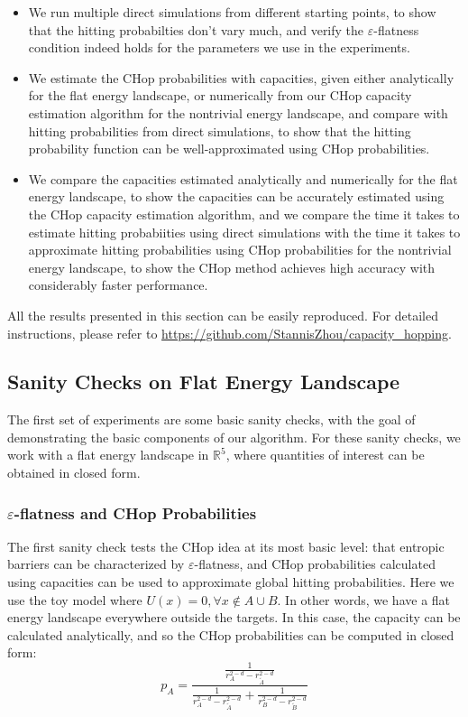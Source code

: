 \documentclass[english, aip, jcp, priprint, graphicx]{revtex4-1}
\theoremstyle{plain}
\theoremstyle{definition}
\theoremstyle{plain}
\begin{document}
\begin{itemize}
\item We run multiple direct simulations from different starting points, to show that the hitting probabilties don't vary much, and verify the $\varepsilon$-flatness condition indeed holds for the parameters we use in the experiments.
\item We estimate the CHop probabilities with capacities, given either analytically for the flat energy landscape, or numerically from our CHop capacity estimation algorithm for the nontrivial energy landscape, and compare with hitting probabilities from direct simulations, to show that the hitting probability function can be well-approximated using CHop probabilities.
\item We compare the capacities estimated analytically and numerically for the flat energy landscape, to show the capacities can be accurately estimated using the CHop capacity estimation algorithm, and we compare the time it takes to estimate hitting probabiities using direct simulations with the time it takes to approximate hitting probabilities using CHop probabilities for the nontrivial energy landscape, to show the CHop method achieves high accuracy with considerably faster performance.
\end{itemize}

All the results presented in this section can be easily reproduced. For detailed instructions, please refer to \url{https://github.com/StannisZhou/capacity_hopping}.

\subsection{Sanity Checks on Flat Energy Landscape}

The first set of experiments are some basic sanity checks, with the goal of demonstrating the basic components of our algorithm. For these sanity checks, we work with a flat energy landscape in $\mathbb{R}^5$, where quantities of interest can be obtained in closed form.

\subsubsection{$\varepsilon$-flatness and CHop Probabilities}

The first sanity check tests the CHop idea at its most basic level: that entropic barriers can be characterized by $\varepsilon$-flatness, and CHop probabilities calculated using capacities can be used to approximate global hitting probabilities. Here we use the toy model where $U(x)=0, \forall x \not\in A\cup B$. In other words, we have a flat energy landscape everywhere outside the targets. In this case, the capacity can be calculated analytically, and so the CHop probabilities can be computed in closed form:
\begin{equation}
p_A = \frac{\frac{1}{r_A^{2 - d} - r_{\tilde{A}}^{2 - d}}}{\frac{1}{r_A^{2 - d} - r_{\tilde{A}}^{2 - d}} + \frac{1}{r_B^{2 - d} - r_{\tilde{B}}^{2 - d}}}
\end{equation}
\end{document}
